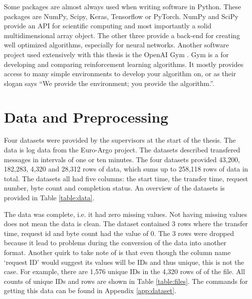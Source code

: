 Some packages are almost always used when writing \ai software in Python.
These packages are NumPy, Scipy, Keras, Tensorflow or PyTorch\footnotemark.
NumPy and SciPy provide an API for scientific computing and most importantly a
solid multidimensional array object. The other three provide a back-end for
creating well optimized \ml algorithms, especially for neural networks.
Another software project used extensively with this thesis is the OpenAI Gym
\cite{gym2016}. Gym is a for developing and comparing reinforcement learning
algorithms. It mostly provides access to many simple environments to develop
your \rl algorithm on, or as their slogan says ``We provide the environment;
you provide the algorithm.''.



\section{Data and Preprocessing}\label{sec:data}

Four datasets were provided by the supervisors at the start of the thesis. The
data is log data from the Euro-Argo project. The
datasets described transfered messages in intervals of one or ten minutes. The
four datasets provided 43,200, 182,283, 4,320 and 28,312 rows of data, which
sums up to 258,118 rows of data in total. The datasets all had five columns:
the start time, the transfer time, request number, byte count and completion
status. An overview of the datasets is provided in Table \ref{table:data}.



The data was complete, i.e. it had zero missing values. Not having missing
values does not mean the data is clean. The dataset contained 3 rows where the
transfer time, request id and byte count had the value of 0. The 3 rows were
dropped because it lead to problems during the conversion of the data into
another format. Another quirk to take note of is that even though the column
name `request ID' would suggest its values will be IDs and thus unique, this
is not the case. For example, there are 1,576 unique IDs in the 4,320 rows of
of the  file. All counts of unique IDs and rows are
shown in Table \ref{table:files}. The commands for getting this data can be
found in Appendix \ref{app:dataset}.

